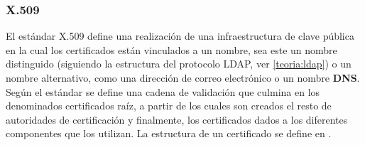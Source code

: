 \subsubsection{X.509}

El estándar X.509\cite{rfc4158} define una realización de una infraestructura de clave pública en la cual los certificados están vinculados a un nombre, sea este un nombre distinguido (siguiendo la estructura del protocolo LDAP, ver \ref{teoria:ldap}) o un nombre alternativo, como una dirección de correo electrónico o un nombre \textbf{DNS}. Según el estándar se define una cadena de validación que culmina en los denominados certificados raíz, a partir de los cuales son creados el resto de autoridades de certificación y finalmente, los certificados dados a los diferentes componentes que los utilizan. La estructura de un certificado se define en \cite{rfc5280}.

